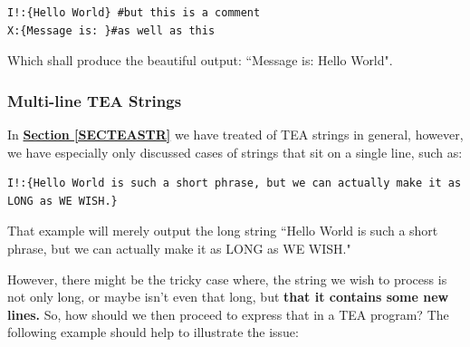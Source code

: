 \documentclass[a4paper, 18pt]{book} %
\begin{document}
{{{\begin{appendices}
\vspace{2em}

  \begin{tcolorbox}[teaterminalstyle, title=TEA STRINGS: Example 2: Strings without Delimiters, breakable]
  \begin{lstlisting}[language=TEA,breaklines=true,]
I!:{Hello World} #but this is a comment
X:{Message is: }#as well as this
   \end{lstlisting}
  \end{tcolorbox}

\vspace{2em}

Which shall produce the beautiful output: ``Message is: Hello World".


\subsubsection{Multi-line TEA Strings}
\label{SECTEAMULTISTR}


In \textbf{\hyperref[SECTEASTR]{Section \ref{SECTEASTR}}} we have treated of TEA strings in general, however, we have especially only discussed cases of strings that sit on a single line, such as:


\vspace{2em}

  \begin{tcolorbox}[teaterminalstyle, title=TEA MULTI-STRINGS: Example 1: Dealing with Long Strings, breakable]
  \begin{lstlisting}[language=TEA,breaklines=true,]
I!:{Hello World is such a short phrase, but we can actually make it as LONG as WE WISH.}
   \end{lstlisting}
  \end{tcolorbox}

\vspace{2em}


That example will merely output the long string ``Hello World is such a short phrase, but we can actually make it as LONG as WE WISH."


\vspace{2em}

However, there might be the tricky case where, the string we wish to process is not only long, or maybe isn't even that long, but \textbf{that it contains some new lines.} So, how should we then proceed to express that in a TEA program? The following example should help to illustrate the issue:

\vspace{2em}


\end{appendices}}}}
\end{document}
